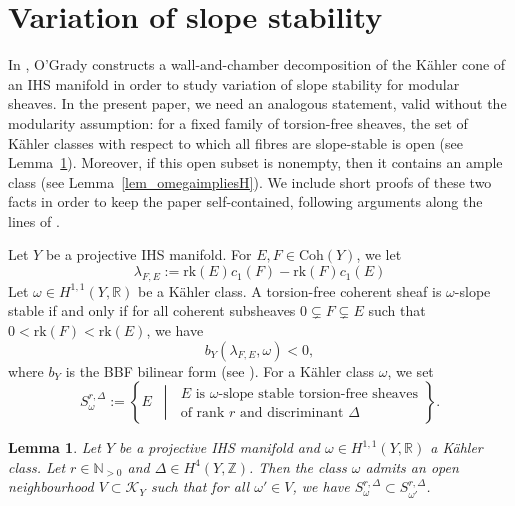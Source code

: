 \documentclass[12pt,a4paper]{amsart}
\theoremstyle{plain}
\newtheorem{lem}[thm]{Lemma}
\theoremstyle{definition}
\theoremstyle{remark}
\def\Coh{\mathrm{Coh}}
\def\Z{\mathbb{Z}}
\def\H{H}
\newcommand{\RR}{\mathbb{R}}
\newcommand{\rk}{\mathrm{rk}}
\begin{document}
\section{Variation of slope stability}\label{appslopestab}
In \cite[Section 5]{OGrady2026}, O'Grady constructs a wall-and-chamber decomposition of the K\"ahler cone of an IHS manifold in order to study variation of slope stability for modular sheaves. In the present paper, we need an analogous statement, valid without the modularity assumption: for a fixed family of torsion-free sheaves, the set of K\"ahler classes with respect to which all fibres are slope-stable is open (see Lemma~\ref{lem_stability_open}). Moreover, if this open subset is nonempty, then it contains an ample class (see Lemma~\ref{lem_omegaimpliesH}). 
We include short proofs of these two facts in order to keep the paper self-contained, following arguments along the lines of \cite{OGrady2026,greb_ross_toma_moduli}.

Let $Y$ be a projective IHS manifold. For $E,F\in\Coh(Y)$, we let
\[
    \lambda_{F,E}:=\rk(E)c_1(F)-\rk(F)c_1(E)
\]
Let $\omega\in \H^{1,1}(Y,\mathbb{R})$ be a K\"ahler class. A torsion-free coherent sheaf is $\omega$-slope stable if and only if for all coherent subsheaves $0\subsetneq F\subsetneq E$ such that $0<\rk(F)<\rk(E)$, we have
\[
b_Y(\lambda_{F,E},\omega)<0,
\]
where $b_Y$ is the BBF bilinear form (see \cite[Lemma 5.1]{OGrady2026}). For a K\"ahler class $\omega$, we set
\[
S^{r,\Delta}_\omega := \left\{E\;\;\middle|\;
\begin{array}{c}
\text{$E$ is $\omega$-slope stable torsion-free sheaves} \\
\text{of rank $r$ and discriminant $\Delta$}
\end{array}
\right\}.
\]
\begin{lem}\label{lem_stability_open}
    Let $Y$ be a projective IHS manifold and $\omega\in \H^{1,1}(Y,\RR)$ a K\"{a}hler class. Let $r\in \mathbb{N}_{>0}$ and $\Delta\in \H^4(Y,\Z)$. Then the class $\omega$ admits an open neighbourhood $V\subset\mathcal{K}_Y$ such that for all $\omega'\in V$, we have $S^{r,\Delta}_\omega\subset S^{r,\Delta}_{\omega'}$.
\end{lem}
\end{document}
